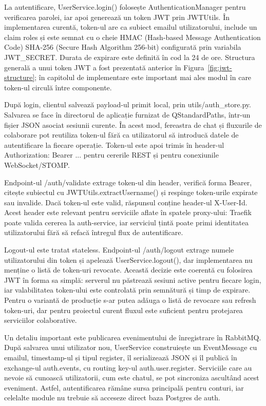 La autentificare, UserService.login() folosește AuthenticationManager pentru verificarea parolei, iar apoi generează un token JWT prin JWTUtils. În implementarea curentă, token-ul are ca subiect emailul utilizatorului, include un claim roles și este semnat cu o cheie HMAC (Hash-based Message Authentication Code) SHA-256 (Secure Hash Algorithm 256-bit) configurată prin variabila JWT\_SECRET. Durata de expirare este definită în cod la 24 de ore. Structura generală a unui token JWT a fost prezentată anterior în Figura~\ref{fig:jwt-structure}; în capitolul de implementare este important mai ales modul în care token-ul circulă între componente.

După login, clientul salvează payload-ul primit local, prin utils/auth\_store.py. Salvarea se face în directorul de aplicație furnizat de QStandardPaths, într-un fișier JSON asociat sesiunii curente. În acest mod, fereastra de chat și fluxurile de colaborare pot reutiliza token-ul fără ca utilizatorul să introducă datele de autentificare la fiecare operație. Token-ul este apoi trimis în header-ul Authorization: Bearer ... pentru cererile REST și pentru conexiunile WebSocket/STOMP.

Endpoint-ul /auth/validate extrage token-ul din header, verifică forma Bearer, citește subiectul cu JWTUtils.extractUsername() și respinge token-urile expirate sau invalide. Dacă token-ul este valid, răspunsul conține header-ul X-User-Id. Acest header este relevant pentru serviciile aflate în spatele proxy-ului: Traefik poate valida cererea la auth-service, iar serviciul țintă poate primi identitatea utilizatorului fără să refacă întregul flux de autentificare.

Logout-ul este tratat stateless. Endpoint-ul /auth/logout extrage numele utilizatorului din token și apelează UserService.logout(), dar implementarea nu menține o listă de token-uri revocate. Această decizie este coerentă cu folosirea JWT în forma sa simplă: serverul nu păstrează sesiuni active pentru fiecare login, iar valabilitatea token-ului este controlată prin semnătură și timp de expirare. Pentru o variantă de producție s-ar putea adăuga o listă de revocare sau refresh token-uri, dar pentru proiectul curent fluxul este suficient pentru protejarea serviciilor colaborative.

Un detaliu important este publicarea evenimentului de înregistrare în RabbitMQ. După salvarea unui utilizator nou, UserService construiește un EventMessage cu emailul, timestamp-ul și tipul register, îl serializează JSON și îl publică în exchange-ul auth.events, cu routing key-ul auth.user.register. Serviciile care au nevoie să cunoască utilizatorii, cum este chatul, se pot sincroniza ascultând acest eveniment. Astfel, autentificarea rămâne sursa principală pentru conturi, iar celelalte module nu trebuie să acceseze direct baza Postgres de auth.

